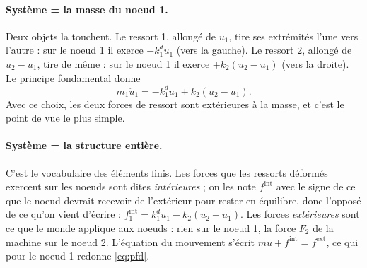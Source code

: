\documentclass[11pt,a4paper]{article}
\newcommand{\kd}{k_1^{d}}
\begin{document}
\paragraph{Système = la masse du noeud 1.} Deux objets la touchent. Le ressort 1, allongé de
$u_1$, tire ses extrémités l'une vers l'autre : sur le noeud 1 il exerce $-\kd u_1$ (vers la
gauche). Le ressort 2, allongé de $u_2-u_1$, tire de même : sur le noeud 1 il exerce
$+k_2(u_2-u_1)$ (vers la droite). Le principe fondamental donne
\begin{equation}
  m_1\ddot u_1 = -\kd u_1 + k_2(u_2-u_1).
  \label{eq:pfd}
\end{equation}
Avec ce choix, les deux forces de ressort sont extérieures à la masse, et c'est le point de vue
le plus simple.

\paragraph{Système = la structure entière.} C'est le vocabulaire des éléments finis. Les forces
que les ressorts déformés exercent sur les noeuds sont dites \emph{intérieures} ; on les note
$f^{\text{int}}$ avec le signe de ce que le noeud devrait recevoir de l'extérieur pour rester en
équilibre, donc l'opposé de ce qu'on vient d'écrire : $f^{\text{int}}_1 = \kd u_1 - k_2(u_2-u_1)$.
Les forces \emph{extérieures} sont ce que le monde applique aux noeuds : rien sur le noeud 1,
la force $F_2$ de la machine sur le noeud 2. L'équation du mouvement s'écrit
$m\ddot u + f^{\text{int}} = f^{\text{ext}}$, ce qui pour le noeud 1 redonne \eqref{eq:pfd}.
\end{document}
